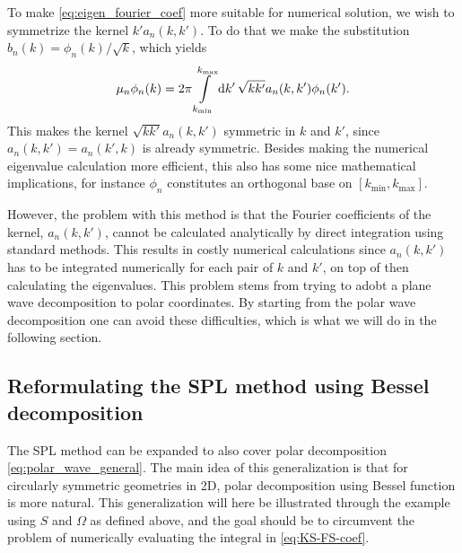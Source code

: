 \documentclass[11pt,a4paper, 
swedish,english %
]{article}
\begin{document}
To make \eqref{eq:eigen_fourier_coef} more suitable for numerical
solution, we wish to symmetrize the kernel $k'a_n(k, k')$. To do
that we make the substitution $b_n(k)=\phi_n(k)/\sqrt{k}$, which
yields 
\begin{equation}\label{eq:eig-n}
\mu_n \phi_n(k) = 2\pi\int_{k_{\min}}^{k_{\max}}\rd{k'}\,
\sqrt{kk'}a_n(k, k') \phi_n(k').
\end{equation}
This makes the kernel $\sqrt{kk'}a_n(k, k')$ symmetric in $k$ and
$k'$, since $a_n(k, k')=a_n(k', k)$ is already symmetric. Besides
making the numerical eigenvalue calculation more efficient, this also
has some nice mathematical implications, for instance $\phi_n$
constitutes an orthogonal base on $[k_{\min}, k_{\max}]$.

However, the problem with this method is that the Fourier coefficients
of the kernel, $a_n(k, k')$, cannot be calculated analytically by
direct integration using standard methods. This results in costly
numerical calculations since $a_n(k, k')$ has to be integrated
numerically for each pair of $k$ and $k'$, on top of then calculating
the eigenvalues. 
This problem stems from trying to adobt a plane wave decomposition to
polar coordinates. By starting from the polar wave decomposition one
can avoid these difficulties, which is what we will do in the
following section. 


\subsection{Reformulating the SPL method using Bessel decomposition}
The SPL method can be expanded to also cover polar decomposition
\eqref{eq:polar_wave_general}. The main idea of this generalization is
that for circularly symmetric geometries in 2D, polar decomposition
using Bessel function is more natural. 
This generalization will here be illustrated through the example using
$S$ and $\Omega$ as defined above, and the goal should be to
circumvent the problem of numerically evaluating the integral in 
\eqref{eq:KS-FS-coef}.
\end{document}
